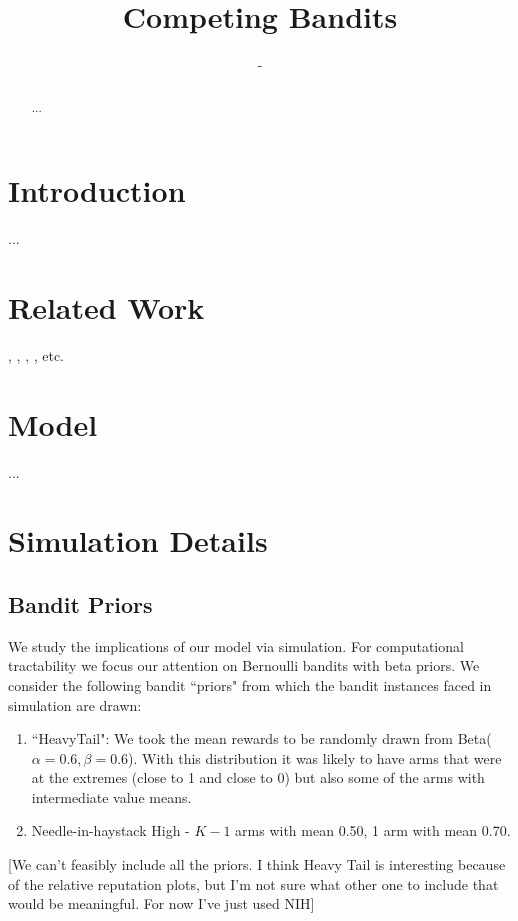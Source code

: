 \documentclass{article}
\title{Competing Bandits}
\author{-}
\theoremstyle{definition}
\begin{document}
\maketitle

\begin{abstract}
...
\end{abstract}

\section{Introduction}
\label{S:1}

...

\section{Related Work}
\label{S:2}

\citealt*{mansour2017competing}, \citealt*{che2017recommender}, \citealt*{kremer2014implementing}, \citealt*{mansour2015bayesian}, etc.

\section{Model}
\label{S:3}

...

\section{Simulation Details}
\label{S:4}

\subsection{Bandit Priors}
We study the implications of our model via simulation. For computational tractability we focus our attention on Bernoulli bandits with beta priors. We consider the following bandit ``priors" from which the bandit instances faced in simulation are drawn:
\begin{enumerate}
\item ``HeavyTail": We took the mean rewards to be randomly drawn from Beta($\alpha=0.6,\beta=0.6$). With this distribution it was likely to have arms that were at the extremes (close to 1 and close to 0) but also some of the arms with intermediate value means.
\item Needle-in-haystack High - $K-1$ arms with mean 0.50, 1 arm with mean 0.70. 
\end{enumerate}

[We can't feasibly include all the priors. I think Heavy Tail is interesting because of the relative reputation plots, but I'm not sure what other one to include that would be meaningful. For now I've just used NIH]
\end{document}
